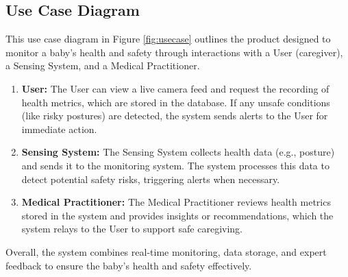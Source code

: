 \documentclass[12pt,a4paper]{report}
\begin{document}
\subsection{Use Case Diagram}
This use case diagram in Figure \ref{fig:usecase} outlines the product designed to monitor a baby's health and safety through interactions with a User (caregiver), a Sensing System, and a Medical Practitioner.

\begin{enumerate}
  \item \textbf{User:} The User can view a live camera feed and request the recording of health metrics, which are stored in the database. If any unsafe conditions (like risky postures) are detected, the system sends alerts to the User for immediate action.
  \item \textbf{Sensing System:} The Sensing System collects health data (e.g., posture) and sends it to the monitoring system. The system processes this data to detect potential safety risks, triggering alerts when necessary.
  \item \textbf{Medical Practitioner:} The Medical Practitioner reviews health metrics stored in the system and provides insights or recommendations, which the system relays to the User to support safe caregiving.
\end{enumerate}
Overall, the system combines real-time monitoring, data storage, and expert feedback to ensure the baby’s health and safety effectively.
\end{document}
